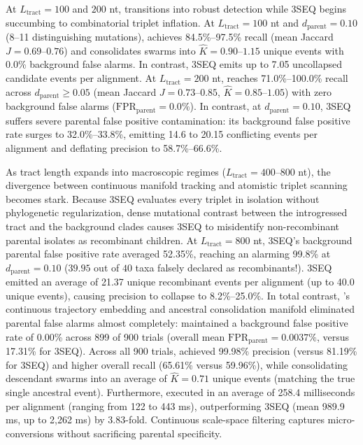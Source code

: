 At $L_{\text{tract}} = 100$ and $200$ nt, \RhizAeon transitions into robust detection while 3SEQ begins succumbing to combinatorial triplet inflation.
At $L_{\text{tract}} = 100$ nt and $d_{\text{parent}} = 0.10$ (8--11 distinguishing mutations), \RhizAeon achieves 84.5\%--97.5\% recall (mean Jaccard $J = 0.69\text{--}0.76$) and consolidates swarms into $\hat{K} = 0.90\text{--}1.15$ unique events with 0.0\% background false alarms.
In contrast, 3SEQ emits up to 7.05 uncollapsed candidate events per alignment.
At $L_{\text{tract}} = 200$ nt, \RhizAeon reaches 71.0\%--100.0\% recall across $d_{\text{parent}} \ge 0.05$ (mean Jaccard $J = 0.73\text{--}0.85$, $\hat{K} = 0.85\text{--}1.05$) with zero background false alarms ($\text{FPR}_{\text{parent}} = 0.0\%$).
In contrast, at $d_{\text{parent}} = 0.10$, 3SEQ suffers severe parental false positive contamination: its background false positive rate surges to 32.0\%--33.8\%, emitting 14.6 to 20.15 conflicting events per alignment and deflating precision to 58.7\%--66.6\%.

As tract length expands into macroscopic regimes ($L_{\text{tract}} = 400\text{--}800$ nt), the divergence between continuous manifold tracking and atomistic triplet scanning becomes stark.
Because 3SEQ evaluates every triplet in isolation without phylogenetic regularization, dense mutational contrast between the introgressed tract and the background clades causes 3SEQ to misidentify non-recombinant parental isolates as recombinant children.
At $L_{\text{tract}} = 800$ nt, 3SEQ's background parental false positive rate averaged 52.35\%, reaching an alarming 99.8\% at $d_{\text{parent}} = 0.10$ ($39.95$ out of $40$ taxa falsely declared as recombinants!).
3SEQ emitted an average of 21.37 unique recombinant events per alignment (up to 40.0 unique events), causing precision to collapse to 8.2\%--25.0\%.
In total contrast, \RhizAeon's continuous trajectory embedding and ancestral consolidation manifold eliminated parental false alarms almost completely: \RhizAeon maintained a background false positive rate of 0.00\% across 899 of 900 trials (overall mean $\text{FPR}_{\text{parent}} = 0.0037\%$, versus 17.31\% for 3SEQ).
Across all 900 trials, \RhizAeon achieved 99.98\% precision (versus 81.19\% for 3SEQ) and higher overall recall (65.61\% versus 59.96\%), while consolidating descendant swarms into an average of $\hat{K} = 0.71$ unique events (matching the true single ancestral event).
Furthermore, \RhizAeon executed in an average of 258.4 milliseconds per alignment (ranging from 122 to 443 ms), outperforming 3SEQ (mean 989.9 ms, up to 2,262 ms) by 3.83-fold.
Continuous scale-space filtering captures micro-conversions without sacrificing parental specificity.

